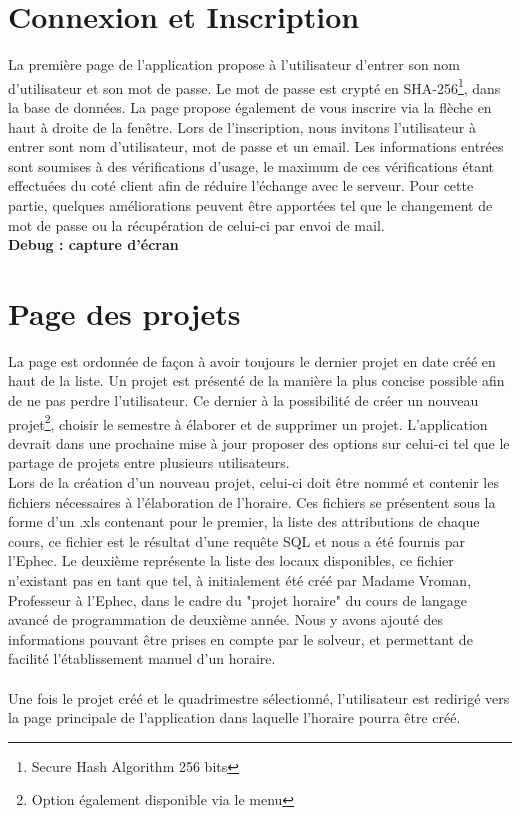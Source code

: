 \section{Connexion et Inscription}

La première page de l'application propose à l'utilisateur d'entrer son nom d'utilisateur et son mot de passe. Le mot de passe est crypté en SHA-256\footnote{Secure Hash Algorithm 256 bits}, dans la base de données. La page propose également de vous inscrire via la flèche en haut à droite de la fenêtre.
\newline
\indent
Lors de l'inscription, nous invitons l'utilisateur à entrer sont nom d'utilisateur, mot de passe et un email. Les informations entrées sont soumises à des vérifications d'usage, le maximum de ces vérifications étant effectuées du coté client afin de réduire l'échange avec le serveur.
\newline
\indent
Pour cette partie, quelques améliorations peuvent être apportées tel que le changement de mot de passe ou la récupération de celui-ci par envoi de mail.\\
\newline
\indent
\textbf{Debug : capture d'écran}

\section{Page des projets}

La page est ordonnée de façon à avoir toujours le dernier projet en date créé en haut de la liste. Un projet est présenté de la manière la plus concise possible afin de ne pas perdre l'utilisateur. Ce dernier à la possibilité de créer un nouveau projet\footnote{Option également disponible via le menu}, choisir le semestre à élaborer et de supprimer un projet. L'application devrait dans une prochaine mise à jour proposer des options sur celui-ci tel que le partage de projets entre plusieurs utilisateurs.\\
\newline
\indent
Lors de la création d'un nouveau projet, celui-ci doit être nommé et contenir les fichiers nécessaires à l'élaboration de l'horaire. Ces fichiers se présentent sous la forme d'un .xls contenant pour le premier, la liste des attributions de chaque cours, ce fichier est le résultat d'une requête SQL et nous a été fournis par l'Ephec. Le deuxième représente la liste des locaux disponibles, ce fichier n'existant pas en tant que tel, à initialement été créé par Madame Vroman, Professeur à l'Ephec, dans le cadre du "projet horaire" du cours de langage avancé de programmation de deuxième année. Nous y avons ajouté des informations pouvant être prises en compte par le solveur, et permettant de facilité l'établissement manuel d'un horaire.\\
\\
Une fois le projet créé et le quadrimestre sélectionné, l'utilisateur est redirigé vers la page principale de l'application dans laquelle l'horaire pourra être créé.


